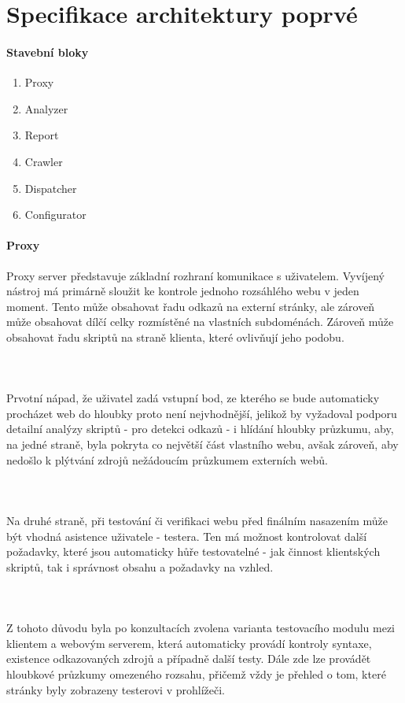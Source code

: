 \documentclass[10pt]{article}
\begin{document}
\section{Specifikace architektury poprv\'e}
\paragraph{Stavebn\'i bloky}
\begin{enumerate}
	\item Proxy
	\item Analyzer
	\item Report
	\item Crawler
	\item Dispatcher
	\item Configurator
\end{enumerate}
\paragraph{Proxy} Proxy server představuje základní rozhraní komunikace s uživatelem. Vyvíjený nástroj má primárně sloužit ke kontrole jednoho rozsáhlého webu v jeden moment. Tento může obsahovat řadu odkazů na externí stránky, ale zároveň může obsahovat dílčí celky rozmístěné na vlastních subdoménách. Zároveň může obsahovat řadu skriptů na straně klienta, které ovlivňují jeho podobu.
\paragraph{~} Prvotní nápad, že uživatel zadá vstupní bod, ze kterého se bude automaticky procházet web do hloubky proto není nejvhodnější, jelikož by vyžadoval podporu detailní analýzy skriptů - pro detekci odkazů - i hlídání hloubky průzkumu, aby, na jedné straně, byla pokryta co největší část vlastního webu, avšak zároveň, aby nedošlo k plýtvání zdrojů nežádoucím průzkumem externích webů.
\paragraph{~} Na druhé straně, při testování či verifikaci webu před finálním nasazením může být vhodná asistence uživatele - testera. Ten má možnost kontrolovat další požadavky, které jsou automaticky hůře testovatelné - jak činnost klientských skriptů, tak i správnost obsahu a požadavky na vzhled.
\paragraph{~} Z tohoto důvodu byla po konzultacích zvolena varianta testovacího modulu mezi klientem a webovým serverem, která automaticky provádí kontroly syntaxe, existence odkazovaných zdrojů a případně další testy. Dále zde lze provádět hloubkové průzkumy omezeného rozsahu, přičemž vždy je přehled o tom, které stránky byly zobrazeny testerovi v prohlížeči.
\end{document}
